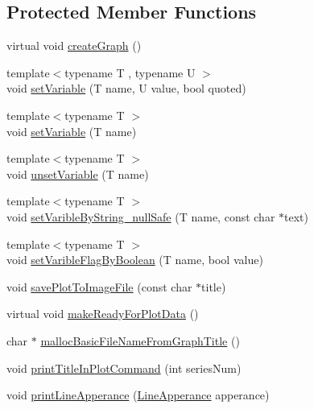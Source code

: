 \subsection*{Protected Member Functions}
\begin{DoxyCompactItemize}
\item 
virtual void \hyperlink{class_g_n_u_plot_bar_graph_a89a417ec362ccfcaeb23db8438d3579e}{create\+Graph} ()
\item 
{\footnotesize template$<$typename T , typename U $>$ }\\void \hyperlink{class_g_n_u_plot_base_a03d371b0c6c7ef89064525438b22d52c}{set\+Variable} (T name, U value, bool quoted)
\item 
{\footnotesize template$<$typename T $>$ }\\void \hyperlink{class_g_n_u_plot_base_a3c8c8f68c13661d91bd844589e1a2a85}{set\+Variable} (T name)
\item 
{\footnotesize template$<$typename T $>$ }\\void \hyperlink{class_g_n_u_plot_base_af9b418bbcafb41d4d51b92018ca4f217}{unset\+Variable} (T name)
\item 
{\footnotesize template$<$typename T $>$ }\\void \hyperlink{class_g_n_u_plot_base_a68171bf36461e54e2b81384c112ad975}{set\+Varible\+By\+String\+\_\+null\+Safe} (T name, const char $\ast$text)
\item 
{\footnotesize template$<$typename T $>$ }\\void \hyperlink{class_g_n_u_plot_base_ae93c5de3241c2b6b6f703a202dc1d94b}{set\+Varible\+Flag\+By\+Boolean} (T name, bool value)
\item 
void \hyperlink{class_g_n_u_plot_base_ab5c851953dd140cc3ee936a5cd329200}{save\+Plot\+To\+Image\+File} (const char $\ast$title)
\item 
virtual void \hyperlink{class_g_n_u_plot_base_adaf91c191e4d889537d401faeb863485}{make\+Ready\+For\+Plot\+Data} ()
\item 
char $\ast$ \hyperlink{class_g_n_u_plot_base_a7f71f3c616b3a4a854f9118a04c40447}{malloc\+Basic\+File\+Name\+From\+Graph\+Title} ()
\item 
void \hyperlink{class_g_n_u_plot_base_a65ae2b3220034bce21c7feb39a632991}{print\+Title\+In\+Plot\+Command} (int series\+Num)
\item 
void \hyperlink{class_g_n_u_plot_base_ad057969aa7f8bdbe884d6a5d03a29722}{print\+Line\+Apperance} (\hyperlink{struct_line_apperance}{Line\+Apperance} apperance)
\item 

\end{DoxyCompactItemize}
